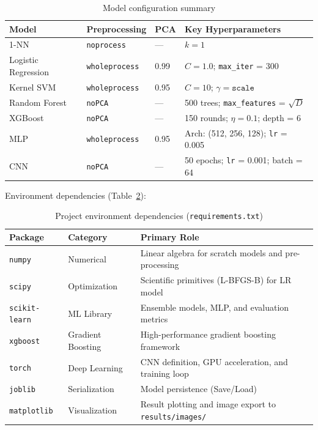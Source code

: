 \documentclass[11pt,a4paper]{article}
\begin{document}
\begin{table}[H]
    \centering
    \renewcommand{\arraystretch}{1.15}
    \small
    \caption{Model configuration summary}
    \label{tab:model_config}
    \begin{tabular}{llll}
        \toprule
        \textbf{Model} & \textbf{Preprocessing} & \textbf{PCA} & \textbf{Key Hyperparameters} \\
        \midrule
        1-NN                & \texttt{noprocess}    & —               & $k = 1$ \\
        Logistic Regression & \texttt{wholeprocess} & 0.99            & $C = 1.0$; \texttt{max\_iter} = 300 \\
        Kernel SVM          & \texttt{wholeprocess} & 0.95            & $C = 10$; $\gamma = \texttt{scale}$ \\
        Random Forest       & \texttt{noPCA}        & —               & 500 trees; \texttt{max\_features} = $\sqrt{D}$ \\
        XGBoost             & \texttt{noPCA}        & —               & 150 rounds; $\eta = 0.1$; depth = 6 \\
        MLP                 & \texttt{wholeprocess} & 0.95            & Arch: (512, 256, 128); \texttt{lr} = 0.005 \\
        CNN                 & \texttt{noPCA}        & —               & 50 epochs; \texttt{lr} = 0.001; batch = 64 \\
        \bottomrule
    \end{tabular}
\end{table}

Environment dependencies (Table~\ref{tab:requirements}):

\begin{table}[H]
    \centering
    \renewcommand{\arraystretch}{1.1}
    \small
    \caption{Project environment dependencies (\texttt{requirements.txt})}
    \label{tab:requirements}
    \begin{tabular}{llp{7.5cm}}
        \toprule
        \textbf{Package} & \textbf{Category} & \textbf{Primary Role} \\
        \midrule
        \texttt{numpy}        & Numerical & Linear algebra for scratch models and pre-processing \\
        \texttt{scipy}        & Optimization & Scientific primitives (L-BFGS-B) for LR model \\
        \texttt{scikit-learn} & ML Library   & Ensemble models, MLP, and evaluation metrics \\
        \texttt{xgboost}      & Gradient Boosting & High-performance gradient boosting framework \\
        \texttt{torch}        & Deep Learning & CNN definition, GPU acceleration, and training loop \\
        \texttt{joblib}       & Serialization & Model persistence (Save/Load) \\
        \texttt{matplotlib}   & Visualization & Result plotting and image export to \texttt{results/images/} \\
        \bottomrule
    \end{tabular}
\end{table}
\end{document}
